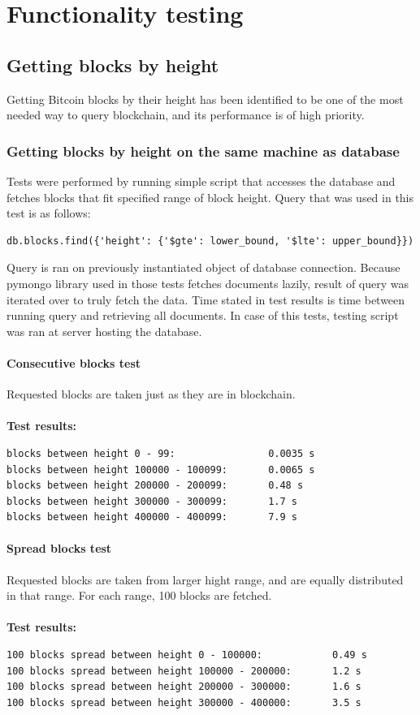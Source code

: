 \documentclass[12pt, en, eng, oneside]{mgr}
\begin{document}
\chapter{Functionality testing}

\section{Getting blocks by height}
Getting Bitcoin blocks by their height has been identified to be one of the most needed way to query blockchain, and its performance is of high priority.

 
\subsection{Getting blocks by height on the same machine as database} 
Tests were performed by running simple script that accesses the database and fetches blocks that fit specified range of block height. Query that was used in this test is as follows: 
\begin{verbatim}
db.blocks.find({'height': {'$gte': lower_bound, '$lte': upper_bound}})
\end{verbatim}
Query is ran on previously instantiated object of database connection. Because pymongo library used in those tests fetches documents lazily, result of query was iterated over to truly fetch the data. Time stated in test results is time between running query and retrieving all documents. In case of this tests, testing script was ran at server hosting the database.

\subsubsection{Consecutive blocks test}
Requested blocks are taken just as they are in blockchain.
\\
\\
\textbf{Test results:}
\begin{verbatim}
blocks between height 0 - 99:                0.0035 s
blocks between height 100000 - 100099:       0.0065 s
blocks between height 200000 - 200099:       0.48 s
blocks between height 300000 - 300099:       1.7 s
blocks between height 400000 - 400099:       7.9 s
\end{verbatim}


\subsubsection{Spread blocks test}
Requested blocks are taken from larger hight range, and are equally distributed in that range. For each range, 100 blocks are fetched.
\\
\\ 
\textbf{Test results:}
\begin{verbatim}
100 blocks spread between height 0 - 100000:            0.49 s
100 blocks spread between height 100000 - 200000:       1.2 s
100 blocks spread between height 200000 - 300000:       1.6 s
100 blocks spread between height 300000 - 400000:       3.5 s
\end{verbatim}
\end{document}
